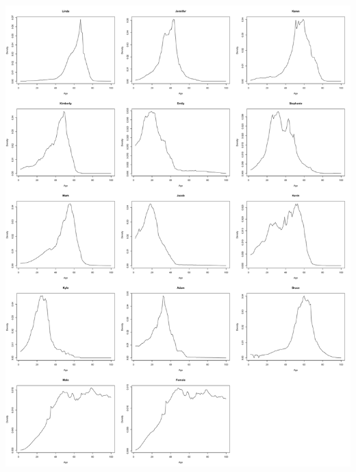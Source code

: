 \documentclass[12pt]{article}
\begin{document}
\begin{center}
\includegraphics[scale = 0.4]{Option2_Histograms.png}
\end{center}
\end{document}
